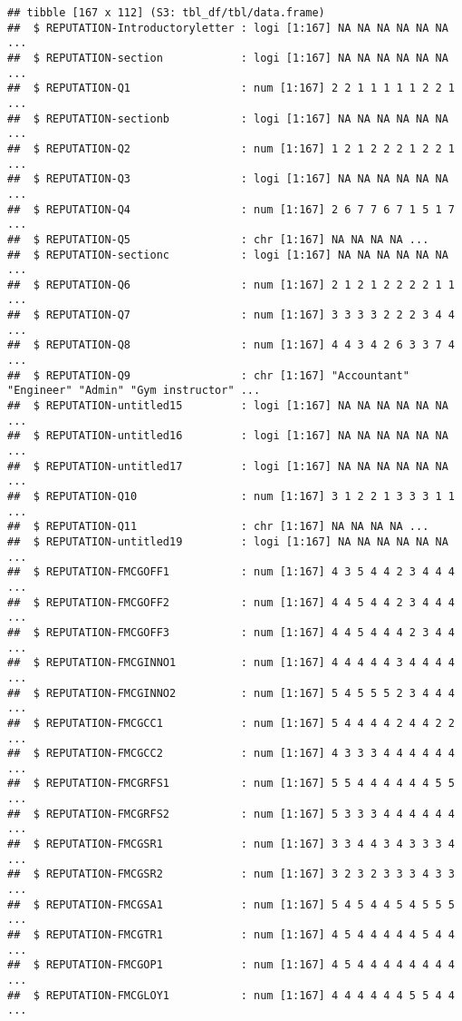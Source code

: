 \documentclass[
]{article}
\begin{document}
\begin{verbatim}
## tibble [167 x 112] (S3: tbl_df/tbl/data.frame)
##  $ REPUTATION-Introductoryletter : logi [1:167] NA NA NA NA NA NA ...
##  $ REPUTATION-section            : logi [1:167] NA NA NA NA NA NA ...
##  $ REPUTATION-Q1                 : num [1:167] 2 2 1 1 1 1 1 2 2 1 ...
##  $ REPUTATION-sectionb           : logi [1:167] NA NA NA NA NA NA ...
##  $ REPUTATION-Q2                 : num [1:167] 1 2 1 2 2 2 1 2 2 1 ...
##  $ REPUTATION-Q3                 : logi [1:167] NA NA NA NA NA NA ...
##  $ REPUTATION-Q4                 : num [1:167] 2 6 7 7 6 7 1 5 1 7 ...
##  $ REPUTATION-Q5                 : chr [1:167] NA NA NA NA ...
##  $ REPUTATION-sectionc           : logi [1:167] NA NA NA NA NA NA ...
##  $ REPUTATION-Q6                 : num [1:167] 2 1 2 1 2 2 2 2 1 1 ...
##  $ REPUTATION-Q7                 : num [1:167] 3 3 3 3 2 2 2 3 4 4 ...
##  $ REPUTATION-Q8                 : num [1:167] 4 4 3 4 2 6 3 3 7 4 ...
##  $ REPUTATION-Q9                 : chr [1:167] "Accountant" "Engineer" "Admin" "Gym instructor" ...
##  $ REPUTATION-untitled15         : logi [1:167] NA NA NA NA NA NA ...
##  $ REPUTATION-untitled16         : logi [1:167] NA NA NA NA NA NA ...
##  $ REPUTATION-untitled17         : logi [1:167] NA NA NA NA NA NA ...
##  $ REPUTATION-Q10                : num [1:167] 3 1 2 2 1 3 3 3 1 1 ...
##  $ REPUTATION-Q11                : chr [1:167] NA NA NA NA ...
##  $ REPUTATION-untitled19         : logi [1:167] NA NA NA NA NA NA ...
##  $ REPUTATION-FMCGOFF1           : num [1:167] 4 3 5 4 4 2 3 4 4 4 ...
##  $ REPUTATION-FMCGOFF2           : num [1:167] 4 4 5 4 4 2 3 4 4 4 ...
##  $ REPUTATION-FMCGOFF3           : num [1:167] 4 4 5 4 4 4 2 3 4 4 ...
##  $ REPUTATION-FMCGINNO1          : num [1:167] 4 4 4 4 4 3 4 4 4 4 ...
##  $ REPUTATION-FMCGINNO2          : num [1:167] 5 4 5 5 5 2 3 4 4 4 ...
##  $ REPUTATION-FMCGCC1            : num [1:167] 5 4 4 4 4 2 4 4 2 2 ...
##  $ REPUTATION-FMCGCC2            : num [1:167] 4 3 3 3 4 4 4 4 4 4 ...
##  $ REPUTATION-FMCGRFS1           : num [1:167] 5 5 4 4 4 4 4 4 5 5 ...
##  $ REPUTATION-FMCGRFS2           : num [1:167] 5 3 3 3 4 4 4 4 4 4 ...
##  $ REPUTATION-FMCGSR1            : num [1:167] 3 3 4 4 3 4 3 3 3 4 ...
##  $ REPUTATION-FMCGSR2            : num [1:167] 3 2 3 2 3 3 3 4 3 3 ...
##  $ REPUTATION-FMCGSA1            : num [1:167] 5 4 5 4 4 5 4 5 5 5 ...
##  $ REPUTATION-FMCGTR1            : num [1:167] 4 5 4 4 4 4 4 5 4 4 ...
##  $ REPUTATION-FMCGOP1            : num [1:167] 4 5 4 4 4 4 4 4 4 4 ...
##  $ REPUTATION-FMCGLOY1           : num [1:167] 4 4 4 4 4 4 5 5 4 4 ...

\end{verbatim}
\end{document}
